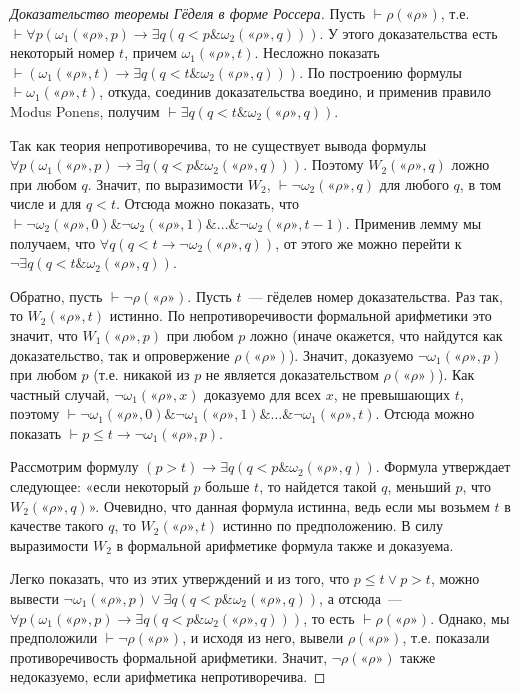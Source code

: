 \documentclass[a4paper,11pt]{article}
\theoremstyle{definition}
\newcommand{\proves}{\vdash}
\newcommand{\amp}{\mathbin{\&}}
\newcommand{\gn}[1]{\text{«}#1\text{»}}
\begin{document}
\begin{proof}[Доказательство теоремы Гёделя в форме Россера]
Пусть $\proves \rho(\gn{\rho})$, т.е. $\proves \forall p(\omega_1(\gn{\rho}, p)
\to \exists q(q < p \amp \omega_2(\gn{\rho}, q)))$. У этого доказательства есть
некоторый номер $t$, причем $\omega_1(\gn{\rho}, t)$. Несложно показать $\proves
(\omega_1(\gn{\rho}, t) \to \exists q(q < t \amp \omega_2(\gn{\rho}, q)))$. По
построению формулы $\proves \omega_1(\gn{\rho}, t)$, откуда, соединив
доказательства воедино, и применив правило Modus Ponens, получим $\proves
\exists q(q < t \amp \omega_2(\gn{\rho}, q))$.

Так как теория непротиворечива, то не существует вывода формулы $\forall
p(\omega_1(\gn{\rho}, p) \to \exists q(q < p \amp \omega_2(\gn{\rho}, q)))$.
Поэтому $W_2(\gn{\rho}, q)$ ложно при любом $q$. Значит, по
выразимости $W_2$, $\proves \neg\omega_2(\gn{\rho}, q)$ для любого $q$, в том
числе и для $q < t$. Отсюда можно показать, что $\proves \neg\omega_2(\gn{\rho},
0) \amp \neg\omega_2(\gn{\rho}, 1) \amp \dots \amp \neg\omega_2(\gn{\rho}, t-1)$.
Применив лемму мы получаем, что $\forall q(q < t \to \neg\omega_2(\gn{\rho},
q))$, от этого же можно перейти к $\neg\exists q(q < t \amp
\omega_2(\gn{\rho}, q))$.

Обратно, пусть $\proves \neg\rho(\gn{\rho})$. Пусть $t$~--- гёделев номер
доказательства. Раз так, то $W_2(\gn{\rho}, t)$ истинно. По непротиворечивости
формальной арифметики это значит, что $W_1(\gn{\rho}, p)$ при любом $p$ ложно
(иначе окажется, что найдутся как доказательство, так и опровержение
$\rho(\gn{\rho})$). Значит, доказуемо $\neg\omega_1(\gn{\rho}, p)$ при любом $p$
(т.е. никакой из $p$ не является доказательством $\rho(\gn{\rho})$). Как
частный случай, $\neg\omega_1(\gn{\rho}, x)$ доказуемо для всех $x$, не
превышающих $t$, поэтому $\proves \neg\omega_1(\gn{\rho}, 0) \amp
\neg\omega_1(\gn{\rho}, 1) \amp \dots \amp \neg\omega_1(\gn{\rho}, t)$. Отсюда
можно показать $\proves p \le t \to \neg\omega_1(\gn{\rho}, p)$.

Рассмотрим формулу $(p > t) \to \exists q(q < p \amp \omega_2(\gn{\rho}, q))$.
Формула утверждает следующее: «если некоторый $p$ больше $t$, то найдется такой
$q$, меньший $p$, что $W_2(\gn{\rho}, q)$». Очевидно, что данная формула
истинна, ведь если мы возьмем $t$ в качестве такого $q$, то $W_2(\gn{\rho}, t)$
истинно по предположению. В силу выразимости $W_2$ в формальной арифметике
формула также и доказуема.

Легко показать, что из этих утверждений и из того, что $p \le t \vee p > t$,
можно вывести $\neg\omega_1(\gn{\rho}, p) \vee \exists q(q < p \amp
\omega_2(\gn{\rho}, q))$, а отсюда~--- $\forall p(\omega_1(\gn{\rho}, p) \to
\exists q(q < p \amp \omega_2(\gn{\rho}, q)))$, то есть $\proves \rho(\gn{\rho})$.
Однако, мы предположили $\proves \neg\rho(\gn{\rho})$, и исходя из него,
вывели $\rho(\gn{\rho})$, т.е. показали противоречивость формальной арифметики.
Значит, $\neg\rho(\gn{\rho})$ также недоказуемо, если арифметика
непротиворечива.
\end{proof}
\end{document}

